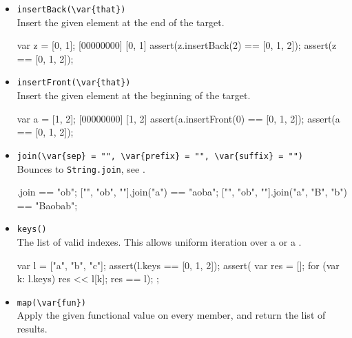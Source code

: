 \begin{itemize}
\item \lstinline|insertBack(\var{that})|\\
  Insert the given element at the end of the target.

\begin{urbiscript}[firstnumber=last]
var z = [0, 1];
[00000000] [0, 1]
assert(z.insertBack(2) == [0, 1, 2]);
assert(z == [0, 1, 2]);
\end{urbiscript}

\item \lstinline|insertFront(\var{that})|\\
  Insert the given element at the beginning of the target.

\begin{urbiscript}[firstnumber=last]
var a = [1, 2];
[00000000] [1, 2]
assert(a.insertFront(0) == [0, 1, 2]);
assert(a == [0, 1, 2]);
\end{urbiscript}

\item \lstinline|join(\var{sep} = "", \var{prefix} = "", \var{suffix} = "")|\\
  Bounces to \lstinline|String.join|, see .

\begin{urbiassert}[firstnumber=last]
["", "ob", ""].join                == "ob";
["", "ob", ""].join("a")           == "aoba";
["", "ob", ""].join("a", "B", "b") == "Baobab";
\end{urbiassert}

\item \lstinline|keys()|\\
  The list of valid indexes.  This allows uniform iteration over a
   or a .

\begin{urbiscript}[firstnumber=last]
{
  var l = ["a", "b", "c"];
  assert(l.keys == [0, 1, 2]);
  assert({
           var res = [];
           for (var k: l.keys)
             res << l[k];
           res
         }
         == l);
};
\end{urbiscript}

\item \lstinline|map(\var{fun})|\\
Apply the given functional value on every member, and return the list
of results.



\end{itemize}
